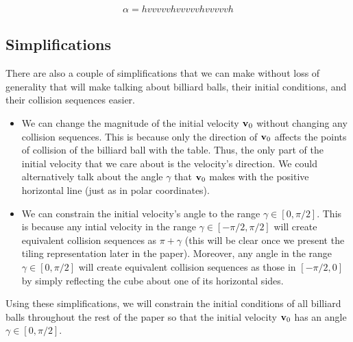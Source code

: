 \begin{eqnarray}
  \alpha = hvvvvvhvvvvvhvvvvvh
\end{eqnarray}

\subsection{Simplifications}

There are also a couple of simplifications that we can make without loss of generality that will make talking about billiard balls, their initial conditions, and their collision sequences easier.

\begin{itemize}
  \item We can change the magnitude of the initial velocity $\mathbf{v}_0$ without changing any collision sequences. This is because only the direction of $\mathbf{v}_0$ affects the points of collision of the billiard ball with the table. Thus, the only part of the initial velocity that we care about is the velocity's direction. We could alternatively talk about the angle $\gamma$ that $\mathbf{v}_0$ makes with the positive horizontal line (just as in polar coordinates).
  \item We can constrain the initial velocity's angle to the range $\gamma \in [0, \pi/2]$. This is because any intial velocity in the range $\gamma \in [-\pi/2, \pi/2]$ will create equivalent collision sequences as $\pi + \gamma$ (this will be clear once we present the tiling representation later in the paper). Moreover, any angle in the range $\gamma \in [0, \pi/2]$ will create equivalent collision sequences as those in $[-\pi/2, 0]$ by simply reflecting the cube about one of its horizontal sides.
\end{itemize}

Using these simplifications, we will constrain the initial conditions of all billiard balls throughout the rest of the paper so that the initial velocity $\mathbf{v}_0$ has an angle $\gamma \in [0, \pi/2]$.
